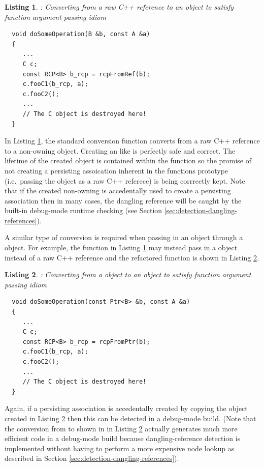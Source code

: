\documentclass[pdf,ps2pdf,11pt]{SANDreport}
\newtheorem{listing}{Listing}
\begin{document}
{}\begin{listing}: Converting from a raw C++ reference to an
{} object to satisfy function argument passing idiom
\label{listing:convert-from-raw-ref-to-RCP}
{\small\begin{verbatim}
  void doSomeOperation(B &b, const A &a)
  {
     ...
     C c;
     const RCP<B> b_rcp = rcpFromRef(b);
     c.fooC1(b_rcp, a);
     c.fooC2();
     ...
     // The C object is destroyed here!
  }
\end{verbatim}}
\end{listing}


In Listing {}\ref{listing:convert-from-raw-ref-to-RCP}, the standard
conversion function {} converts from a raw C++
reference to a non-owning {} object.  Creating an {}
like is perfectly safe and correct.  The lifetime of the created
{} object is contained within the function
{} so the promise of not creating a
persisting assoication inherent in the functions prototype (i.e.\
passing the {} object as a raw C++ referece) is being
corrrectly kept.  Note that if the created non-owning {} is
accedentally used to create a persisting association then in many
cases, the dangling reference will be caught by the built-in
debug-mode runtime checking (see Section
{}\ref{sec:detection-dangling-references}).

A similar type of conversion is required when passing in an object
through a {}\ttt{Ptr} object.  For example, the function in Listing
{}\ref{listing:convert-from-raw-ref-to-RCP} may instead pass in a
{}\ttt{Ptr<B>} object instead of a raw C++ reference {}\ttt{B\&} and
the refactored function is shown in Listing
{}\ref{listing:convert-from-Ptr-to-RCP}.


{}\begin{listing}: Converting from a {} object to an
{} object to satisfy function argument passing idiom
\label{listing:convert-from-Ptr-to-RCP}
{\small\begin{verbatim}
  void doSomeOperation(const Ptr<B> &b, const A &a)
  {
     ...
     C c;
     const RCP<B> b_rcp = rcpFromPtr(b);
     c.fooC1(b_rcp, a);
     c.fooC2();
     ...
     // The C object is destroyed here!
  }
\end{verbatim}}
\end{listing}


Again, if a persisting association is accedentally created by copying
the {}\ttt{RCP<B>} object created in Listing
{}\ref{listing:convert-from-Ptr-to-RCP} then this can be detected in a
debug-mode build.  (Note that the conversion from {}\ttt{Ptr<B>} to
{}\ttt{RCP<B>} shown in in Listing
{}\ref{listing:convert-from-Ptr-to-RCP} actually generates much more
efficient code in a debug-mode build because dangling-reference
detection is implemented without having to perform a more expensive
node lookup as described in Section
{}\ref{sec:detection-dangling-references}).
\end{document}
